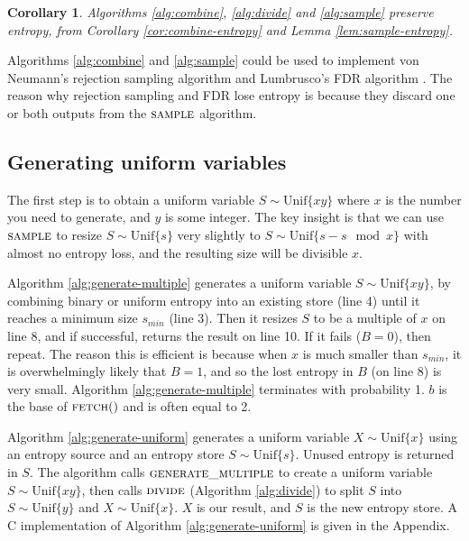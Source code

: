 \documentclass[lettersize,journal]{IEEEtran}
\newtheorem{corollary}{Corollary}
\newcommand{\unif}[1]{\mathrm{Unif}\{#1\}}
\begin{document}
\begin{corollary}
    Algorithms \ref{alg:combine}, \ref{alg:divide} and \ref{alg:sample} preserve entropy, from Corollary \ref{cor:combine-entropy} and Lemma \ref{lem:sample-entropy}.
\end{corollary}

Algorithms \ref{alg:combine} and \ref{alg:sample} could be used to implement von Neumann's rejection sampling algorithm \cite{neumann51} and Lumbrusco's FDR algorithm \cite{lumbroso2013optimal}. The reason why rejection sampling and FDR lose entropy is because they discard one or both outputs from the $\textsc{sample}$ algorithm.



\subsection{Generating uniform variables}

The first step is to obtain a uniform variable $S \sim \unif{xy}$ where $x$ is the number you need to generate, and $y$ is some integer. The key insight is that we can use $\textsc{sample}$ to resize $S \sim \unif{s}$ very slightly to $S \sim \unif{s - s \mod x}$ with almost no entropy loss, and the resulting size will be divisible $x$.

Algorithm \ref{alg:generate-multiple} generates a uniform variable $S \sim \unif{xy}$, by combining binary or uniform entropy into an existing store (line 4) until it reaches a minimum size $s_{min}$ (line 3). Then it resizes $S$ to be a multiple of $x$ on line 8, and if successful, returns the result on line 10. If it fails ($B=0$), then repeat. The reason this is efficient is because when $x$ is much smaller than $s_{min}$, it is overwhelmingly likely that $B=1$, and so the lost entropy in $B$ (on line 8) is very small. Algorithm \ref{alg:generate-multiple} terminates with probability 1. $b$ is the base of $\textsc{fetch}()$ and is often equal to 2.

Algorithm \ref{alg:generate-uniform} generates a uniform variable $X \sim \unif{x}$ using an entropy source and an entropy store $S \sim \unif{s}$. Unused entropy is returned in $S$. The algorithm calls $\textsc{generate\_multiple}$ to create a uniform variable $S \sim \unif{xy}$, then calls $\textsc{divide}$ (Algorithm \ref{alg:divide}) to split $S$ into $S \sim \unif{y}$ and $X \sim \unif{x}$. $X$ is our result, and $S$ is the new entropy store. A C implementation of Algorithm \ref{alg:generate-uniform} is given in the Appendix.
\end{document}
